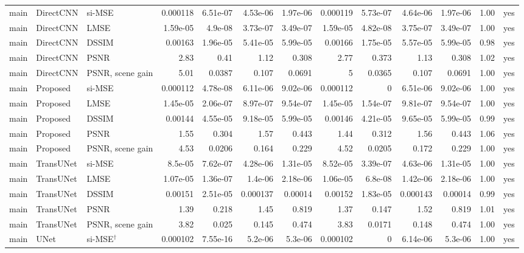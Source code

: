 \begin{table}[!p]
{\begin{tabular}{lllrrrrrrrrrl}
\addlinespace
main & DirectCNN & si-MSE & 0.000118 & 6.51e-07 & 4.53e-06 & 1.97e-06 & 0.000119 & 5.73e-07 & 4.64e-06 & 1.97e-06 & 1.00 & yes \\
main & DirectCNN & LMSE & 1.59e-05 & 4.9e-08 & 3.73e-07 & 3.49e-07 & 1.59e-05 & 4.82e-08 & 3.75e-07 & 3.49e-07 & 1.00 & yes \\
main & DirectCNN & DSSIM & 0.00163 & 1.96e-05 & 5.41e-05 & 5.99e-05 & 0.00166 & 1.75e-05 & 5.57e-05 & 5.99e-05 & 0.98 & yes \\
main & DirectCNN & PSNR & 2.83 & 0.41 & 1.12 & 0.308 & 2.77 & 0.373 & 1.13 & 0.308 & 1.02 & yes \\
main & DirectCNN & PSNR, scene gain & 5.01 & 0.0387 & 0.107 & 0.0691 & 5 & 0.0365 & 0.107 & 0.0691 & 1.00 & yes \\
\addlinespace
main & Proposed & si-MSE & 0.000112 & 4.78e-08 & 6.11e-06 & 9.02e-06 & 0.000112 & 0 & 6.51e-06 & 9.02e-06 & 1.00 & yes \\
main & Proposed & LMSE & 1.45e-05 & 2.06e-07 & 8.97e-07 & 9.54e-07 & 1.45e-05 & 1.54e-07 & 9.81e-07 & 9.54e-07 & 1.00 & yes \\
main & Proposed & DSSIM & 0.00144 & 4.55e-05 & 9.18e-05 & 5.99e-05 & 0.00146 & 4.21e-05 & 9.65e-05 & 5.99e-05 & 0.99 & yes \\
main & Proposed & PSNR & 1.55 & 0.304 & 1.57 & 0.443 & 1.44 & 0.312 & 1.56 & 0.443 & 1.06 & yes \\
main & Proposed & PSNR, scene gain & 4.53 & 0.0206 & 0.164 & 0.229 & 4.52 & 0.0205 & 0.172 & 0.229 & 1.00 & yes \\
\addlinespace
main & TransUNet & si-MSE & 8.5e-05 & 7.62e-07 & 4.28e-06 & 1.31e-05 & 8.52e-05 & 3.39e-07 & 4.63e-06 & 1.31e-05 & 1.00 & yes \\
main & TransUNet & LMSE & 1.07e-05 & 1.36e-07 & 1.4e-06 & 2.18e-06 & 1.06e-05 & 6.8e-08 & 1.42e-06 & 2.18e-06 & 1.00 & yes \\
main & TransUNet & DSSIM & 0.00151 & 2.51e-05 & 0.000137 & 0.00014 & 0.00152 & 1.83e-05 & 0.000143 & 0.00014 & 0.99 & yes \\
main & TransUNet & PSNR & 1.39 & 0.218 & 1.45 & 0.819 & 1.37 & 0.147 & 1.52 & 0.819 & 1.01 & yes \\
main & TransUNet & PSNR, scene gain & 3.82 & 0.025 & 0.145 & 0.474 & 3.83 & 0.0171 & 0.148 & 0.474 & 1.00 & yes \\
\addlinespace
main & UNet & si-MSE$^\dagger$ & 0.000102 & 7.55e-16 & 5.2e-06 & 5.3e-06 & 0.000102 & 0 & 6.14e-06 & 5.3e-06 & 1.00 & yes \\

\end{tabular}}
\end{table}
